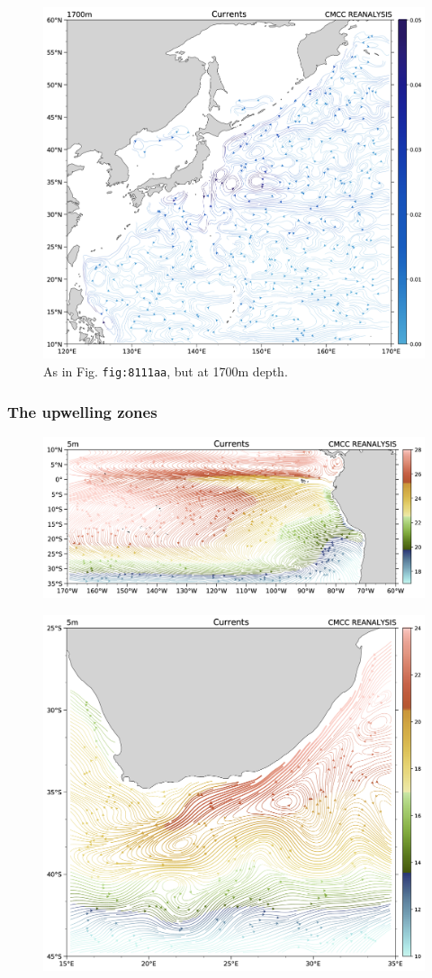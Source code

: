 \begin{figure}
	\centering
	\includegraphics[width = .7 \textwidth]{figs/GD/UVstream1700mKUR.png}
	\caption{As in Fig. \texttt{fig:8111aa}, but at 1700m depth.}
\end{figure}

\subsubsection{The upwelling zones}\label{the-upwelling-zones}

\begin{figure}
	\centering
	\includegraphics[width = .7 \textwidth]{figs/GD/UVstream5mSATemp.png}
	\caption{} \label{fig:}
\end{figure}

\begin{figure}
	\centering
	\includegraphics[width = .7 \textwidth]{figs/GD/UVstream5mAFRemp.png}
	\caption{} \label{fig:}
\end{figure}

